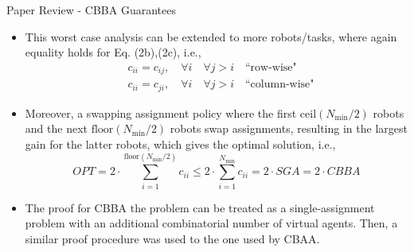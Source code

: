 \begin{frame}{Paper Review - CBBA Guarantees}
    \begin{itemize} 
        \item This worst case analysis can be extended to more robots/tasks, where again equality holds for  Eq. (2b),(2c), i.e., 
        \begin{subequations}
            \begin{align}
            & c_{ii} = c_{ij}, \quad \forall i \quad \forall j > i \quad \text{``row-wise"} \\ 
            & c_{ii} = c_{ji}, \quad \forall i \quad \forall j > i \quad \text{``column-wise"}
            \end{align}
        \end{subequations}
        \item Moreover, a swapping assignment policy where the first $\text{ceil}(N_{\text{min}}/2)$ robots and the next $\text{floor}(N_{\text{min}}/2)$ robots swap assignments, resulting in the largest gain for the latter robots, which gives the optimal solution, i.e., 
        \begin{equation}
            OPT = 2 \cdot \sum_{i=1}^{\text{floor}(N_{\text{min}}/2)} c_{ii} \le 2 \cdot \sum_{i=1}^{N_{\text{min}}} c_{ii} = 2 \cdot SGA = 2 \cdot CBBA
        \end{equation}
        \item The proof for CBBA the problem can be treated as a single-assignment problem with an additional combinatorial number of virtual agents. Then, a similar proof procedure was used to the one used by CBAA.
    \end{itemize}
\end{frame}